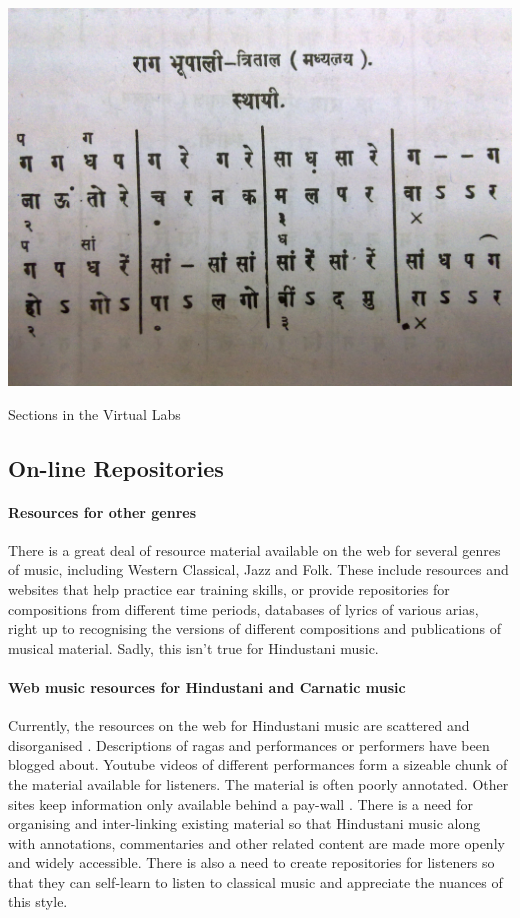 \documentclass{tufte-handout}
\begin{document}
\begin{marginfigure}%
  \includegraphics[width=\linewidth]{bhatk1.jpg}
  \caption{Sections in the Virtual Labs}
  \label{fig:marginfig}
\end{marginfigure}
\subsection{On-line Repositories}
\paragraph{Resources for other genres} There is a
great deal of resource material available on the web for
several genres of music, including Western
Classical\cite{IMSLP-petrucci}, Jazz and
Folk\cite{smithsonian}.  These include resources and
websites that help practice ear training skills, or provide
repositories for compositions from different time periods,
databases of lyrics of various arias, right up to
recognising the versions of different compositions and
publications of musical material.  Sadly, this isn't true
for Hindustani music.

\paragraph{Web music resources for Hindustani and Carnatic music}
Currently, the resources on the web for Hindustani music are
scattered and disorganised \cite{sra,ncpa}.  Descriptions of
ragas and performances or performers have been blogged
about\cite{parrikar,deepakraja}.  Youtube videos of
different performances form a sizeable chunk of the material
available for listeners.  The material is often poorly
annotated.  Other sites keep information only available
behind a pay-wall \cite{swarganga}.  There is a need for
organising and inter-linking existing material so that
Hindustani music along with annotations, commentaries and
other related content are made more openly and widely
accessible.  There is also a need to create repositories for
listeners so that they can self-learn to listen to classical
music and appreciate the nuances of this style.
%
\end{document}
